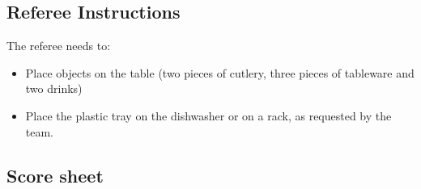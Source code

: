 \subsection*{Referee Instructions}

The referee needs to:
\begin{itemize}
	\item Place objects on the table (two pieces of cutlery, three pieces of tableware and two drinks)
	\item Place the plastic tray on the dishwasher or on a rack, as requested by the team.
\end{itemize}

\subsection*{Score sheet}


